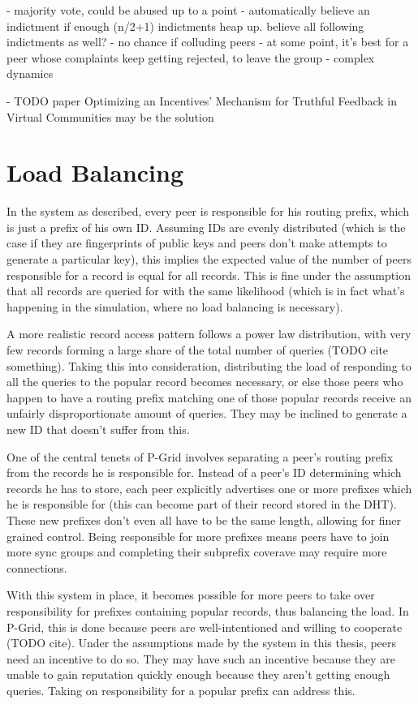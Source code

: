 - majority vote, could be abused up to a point
- automatically believe an indictment if enough (n/2+1) indictments heap up.
  believe all following indictments as well?
- no chance if colluding peers
- at some point, it's best for a peer whose complaints keep getting rejected, to
  leave the group
- complex dynamics

- TODO paper Optimizing an Incentives’ Mechanism for Truthful Feedback in
  Virtual Communities may be the solution

\section{Load Balancing}
\label{sec:desc_load_balancing}
In the system as described, every peer is responsible for his routing prefix,
which is just a prefix of his own ID. Assuming IDs are evenly distributed (which
is the case if they are fingerprints of public keys and peers don't make
attempts to generate a particular key), this implies the expected value of the
number of peers responsible for a record is equal for all records. This is fine
under the assumption that all records are queried for with the same likelihood
(which is in fact what's happening in the simulation, where no load balancing is
necessary).

A more realistic record access pattern follows a power law distribution, with
very few records forming a large share of the total number of queries (TODO cite
something). Taking this into consideration, distributing the load of responding
to all the queries to the popular record becomes necessary, or else those peers
who happen to have a routing prefix matching one of those popular records
receive an unfairly disproportionate amount of queries. They may be inclined to
generate a new ID that doesn't suffer from this.

One of the central tenets of P-Grid involves separating a peer's routing prefix
from the records he is responsible for. Instead of a peer's ID determining which
records he has to store, each peer explicitly advertises one or more prefixes
which he is responsible for (this can become part of their record stored in the
\ac{DHT}). These new prefixes don't even all have to be the same length,
allowing for finer grained control. Being responsible for more prefixes means
peers have to join more sync groups and completing their subprefix coverave may
require more connections.

With this system in place, it becomes possible for more peers to take over
responsibility for prefixes containing popular records, thus balancing the load.
In P-Grid, this is done because peers are well-intentioned and willing to
cooperate (TODO cite). Under the assumptions made by the system in this thesis,
peers need an incentive to do so. They may have such an incentive because they
are unable to gain reputation quickly enough because they aren't getting enough
queries. Taking on responsibility for a popular prefix can address this.

